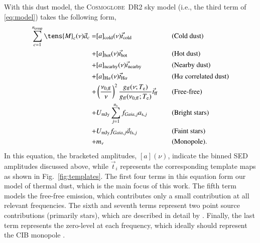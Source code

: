 \documentclass{aa}
\newcommand{\M}[0]{\tens{M}}
\renewcommand{\a}[0]{\vec{a}}
\renewcommand{\t}[0]{\vec{t}}
\def\Cosmoglobe{\textsc{Cosmoglobe}}
\def\nuzeroff{\ifmmode \nu_{0,\mathrm{ff}}\else $\nu_{0,\mathrm{ff}}$\fi}
\def\Te{\ifmmode T_{\mathrm{e}}\else $T_{\mathrm{e}}$\fi}
\begin{document}
{With this dust model, the \Cosmoglobe\ DR2 sky model (i.e., the third
term of \cref{eq:model}) takes the following form,
\begin{equation}
\label{eq:skymodel}
\begin{aligned}
  \sum_{c=1}^{n_{\mathrm{comp}}} \M_c(\nu) \a_c  = 
    &[a]_{\mathrm{cold}}(\nu)\t_{\mathrm{cold}} && \textrm{(Cold dust)} \\
    + & [a]_{\mathrm{hot}}(\nu)\t_{\mathrm{hot}} && \textrm{(Hot dust)}\\
    + & [a]_{\mathrm{nearby}}(\nu)\t_{\mathrm{nearby}} && \textrm{(Nearby dust)} \\
    + & [a]_{\mathrm{H\alpha}}(\nu)\t_{\mathrm{H\alpha}} && \textrm{(H$\alpha$ correlated dust)} \\
  + &\left(\frac{\nuzeroff}{\nu}\right)^2
  \frac{g_{\mathrm{ff}}(\nu;\Te) }{g_{\mathrm{ff}}(\nuzeroff;\Te)}
  \vec{t}_{\mathrm{ff}} && \textrm{(Free-free)} \\
  + &U_{\mathrm{mJy}} \sum_{j=1}^{n_{\mathrm{s}}}
  f_{\mathit{Gaia},j} a_{\mathrm{s},j} &\quad&
  \textrm{(Bright stars)} \\
  + &U_{\mathrm{mJy}} f_{\mathit{Gaia},j} \a_{\mathrm{fs},j} &\quad&
  \textrm{(Faint stars)} \\  
  + &m_{\nu} && \textrm{(Monopole)}. 
\end{aligned}
\end{equation}
In this equation, the bracketed amplitudes, $[a](\nu)$, indicate the
binned SED amplitudes discussed above, while $\t_i$ represents the
corresponding template maps as shown in Fig.~\ref{fig:templates}. The
first four terms in this equation form our model of thermal dust,
which is the main focus of this work. The fifth term models the
free-free emission, which contributes only a small contribution at all
relevant frequencies. The sixth and seventh terms represent two point
source contributions (primarily stars), which are described in detail
by \citet{CG02_04}. Finally, the last term represents the zero-level
at each frequency, which ideally should represent the CIB monopole
\citep{CG02_03}. 

}
\end{document}
